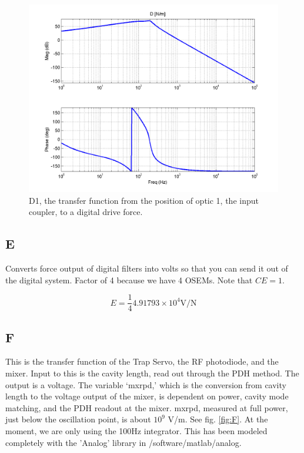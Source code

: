 \begin{figure}[htb!]
\includegraphics[width=\columnwidth]{figures/controls/D.png}%
\caption[D1 transfer function]{D1, the transfer function from the position of optic 1, the input coupler, to a digital drive force. }%
\label{fig:D}%
\end{figure}

\subsection{E}

Converts force output of digital filters into volts so that you can send it out of the digital system. Factor of 4 because we have 4 OSEMs.  Note that $CE = 1$.


\begin{equation}
E = \frac{1}{4} 4.91793\times 10^{4}\mbox{V/N}
\label{eq:E}
\end{equation}

\subsection{F}

This is the transfer function of the Trap Servo, the RF photodiode, and the mixer.  Input to this is the cavity length, read out through the PDH method. The output is a voltage. The variable `mxrpd,' which is the conversion from cavity length to the voltage output of the mixer, is dependent on power, cavity mode matching, and the PDH readout at the mixer. mxrpd, measured at full power, just below the oscillation point, is about $10^9$ V/m. See fig. \ref{fig:F}.  At the moment, we are only using the 100Hz integrator.  This has been modeled completely with the 'Analog' library in /software/matlab/analog.



